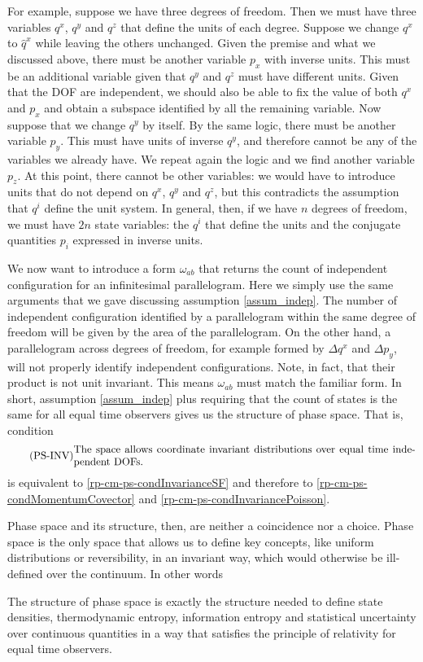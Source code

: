 For example, suppose we have three degrees of freedom. Then we must have three variables $q^x$, $q^y$ and $q^z$ that define the units of each degree. Suppose we change $q^x$ to $\hat{q}^x$ while leaving the others unchanged. Given the premise and what we discussed above, there must be another variable $p_x$ with inverse units. This must be an additional variable given that $q^y$ and $q^z$ must have different units. Given that the DOF are independent, we should also be able to fix the value of both $q^x$ and $p_x$ and obtain a subspace identified by all the remaining variable. Now suppose that we change $q^y$ by itself. By the same logic, there must be another variable $p_y$. This must have units of inverse $q^y$, and therefore cannot be any of the variables we already have. We repeat again the logic and we find another variable $p_z$. At this point, there cannot be other variables: we would have to introduce units that do not depend on $q^x$, $q^y$ and $q^z$, but this contradicts the assumption that $q^i$ define the unit system. In general, then, if we have $n$ degrees of freedom, we must have $2n$ state variables: the $q^i$ that define the units and the conjugate quantities $p_i$ expressed in inverse units.

We now want to introduce a form $\omega_{ab}$ that returns the count of independent configuration for an infinitesimal parallelogram. Here we simply use the same arguments that we gave discussing assumption \ref{assum_indep}. The number of independent configuration identified by a parallelogram within the same degree of freedom will be given by the area of the parallelogram. On the other hand, a parallelogram across degrees of freedom, for example formed by $\Delta q^x$ and $\Delta p_y$, will not properly identify independent configurations. Note, in fact, that their product is not unit invariant. This means $\omega_{ab}$ must match the familiar form. In short, assumption \ref{assum_indep} plus requiring that the count of states is the same for all equal time observers gives us the structure of phase space. That is, condition
\begin{equation}\tag{PS-INV}\label{rp-cm-ps-condInvariantDensity}
	\eqtext{The space allows coordinate invariant distributions over equal time  independent DOFs.}
\end{equation}
is equivalent to \ref{rp-cm-ps-condInvarianceSF} and therefore to \ref{rp-cm-ps-condMomentumCovector} and \ref{rp-cm-ps-condInvariancePoisson}.

Phase space and its structure, then, are neither a coincidence nor a choice. Phase space is the only space that allows us to define key concepts, like uniform distributions or reversibility, in an invariant way, which would otherwise be ill-defined over the continuum. In other words
\begin{insight}
	The structure of phase space is exactly the structure needed to define state densities, thermodynamic entropy, information entropy and statistical uncertainty over continuous quantities in a way that satisfies the principle of relativity for equal time observers.
\end{insight}


